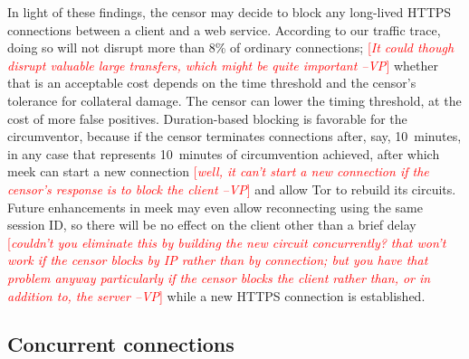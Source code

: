 \documentclass{sig-alternate}
\newcommand{\meek}{meek\xspace}
\newcommand{\note}[1]{{\textcolor{red}{[\textit{#1}]}}}
\newcommand{\vp}[1]{\note{#1 --VP}}
\begin{document}
In light of these findings,
the censor may decide to block any long-lived HTTPS connections between
a client and a web service.
According to our traffic trace, doing so will not disrupt more than 8\% of ordinary connections;
\vp{It could though disrupt valuable large transfers, which might be quite
important}
whether that is an acceptable cost depends on the time threshold and the censor's
tolerance for collateral damage.
The censor can lower the timing threshold, at the cost of more false positives.
Duration-based blocking is favorable for the circumventor,
because if the censor terminates connections after, say, 10~minutes,
in any case that represents 10~minutes of circumvention achieved,
after which \meek can start a new connection
\vp{well, it can't start a new connection if the censor's response is to block
the client}
and allow Tor to rebuild its circuits.
Future enhancements in \meek may even allow reconnecting using the same session ID,
so there will be no effect on the client other than a brief delay
\vp{couldn't you eliminate this by building the new circuit concurrently?
that won't work if the censor blocks by IP rather than by connection;
but you have that problem anyway particularly if the censor blocks the
client rather than, or in addition to, the server}
while a new HTTPS connection is established.


\subsection{Concurrent connections}

\end{document}
